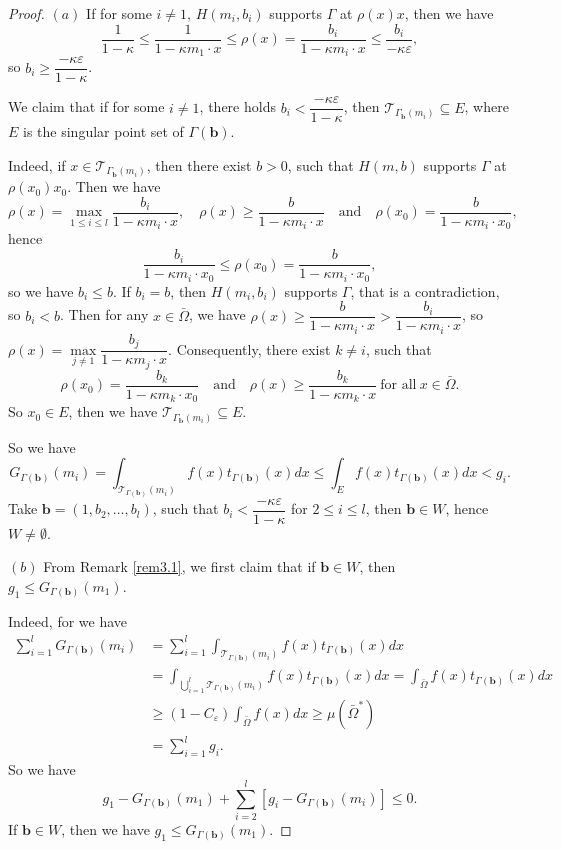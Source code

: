 \documentclass[a4paper,12pt,]{article}
\numberwithin{equation}{section}
\numberwithin{equation}{section} \allowdisplaybreaks
\begin{document}
\begin{proof}
  $(a)$ If for some $i \neq 1$, $H(m_{i},b_{i})$ supports $\Gamma$ at $\rho(x)x$, then we have
  $$\frac{1}{1 - \kappa} \leq \frac{1}{1 - \kappa m_{1} \cdot x} \leq \rho(x) = \frac{b_{i}}{1 - \kappa m_{i} \cdot x} \leq \frac{b_{i}}{-\kappa \varepsilon},$$
  so $b_{i} \geq \dfrac{-\kappa \varepsilon}{1 - \kappa}$.

  We claim that if for some $i \neq 1$, there holds $b_{i} < \dfrac{-\kappa \varepsilon}{1 - \kappa}$, then $\mathcal{T}_{\Gamma_{\mathbf{b}}(m_{i})} \subseteq E$, where $E$ is the singular point set of $\Gamma(\mathbf{b})$.

  Indeed, if $x \in \mathcal{T}_{\Gamma_{\mathbf{b}}(m_{i})}$, then there exist $b>0$, such that $H(m,b)$ supports $\Gamma$ at $\rho(x_{0})x_{0}$. Then we have
  $$\rho(x) = \max_{1 \leq i \leq l}\frac{b_{i}}{1 - \kappa m_{i} \cdot x}, \quad \rho(x) \geq \frac{b}{1 - \kappa m_{i} \cdot x} \quad \text{and} \quad \rho(x_{0}) = \frac{b}{1 - \kappa m_{i} \cdot x_{0}},$$
  hence
  $$\frac{b_{i}}{1 - \kappa m_{i} \cdot x_{0}} \leq \rho(x_{0}) = \frac{b}{1 - \kappa m_{i} \cdot x_{0}},$$
  so we have $b_{i} \leq b$. If $b_{i} = b$, then $H(m_{i},b_{i})$ supports $\Gamma$, that is a contradiction, so $b_{i} < b$. Then for any $x \in \bar{\Omega}$, we have $\rho(x) \geq \dfrac{b}{1 - \kappa m_{i} \cdot x} > \dfrac{b_{i}}{1 - \kappa m_{i} \cdot x}$, so $\rho(x) = \max\limits_{j \neq 1} \dfrac{b_{j}}{1 - \kappa m_{j} \cdot x}$. Consequently, there exist $k \neq i$, such that
  $$\rho(x_{0}) = \frac{b_{k}}{1 - \kappa m_{k} \cdot x_{0}} \quad \text{and} \quad \rho(x) \geq \frac{b_{k}}{1 - \kappa m_{k} \cdot x}~\text{for all}~x\in \bar{\Omega}.$$
  So $x_{0} \in E$, then we have $\mathcal{T}_{\Gamma_{\mathbf{b}}(m_{i})} \subseteq E$.

  So we have
  $$G_{\Gamma(\mathbf{b})}(m_{i}) = \int_{\mathcal{T}_{\Gamma(\mathbf{b})}(m_{i})}f(x)t_{\Gamma(\mathbf{b})}(x)dx \leq  \int_{E}f(x)t_{\Gamma(\mathbf{b})}(x)dx < g_{i}.$$
  Take $\mathbf{b} = (1,b_{2}, \ldots, b_{l})$, such that $b_{i} < \dfrac{-\kappa \varepsilon}{1 - \kappa}$ for $2 \leq i \leq l$, then $\mathbf{b} \in W$, hence $W \neq \emptyset$.

  $(b)$ From Remark \ref{rem3.1}, we first claim that if $\mathbf{b} \in W$, then $g_{1} \leq G_{\Gamma(\mathbf{b})}(m_{1})$.

  Indeed, for we have
  \begin{align*}
     \sum_{i=1}^{l} G_{\Gamma(\mathbf{b})}(m_{i}) & =  \sum_{i=1}^{l} \int_{\mathcal{T}_{\Gamma(\mathbf{b})}(m_{i})}f(x)t_{\Gamma(\mathbf{b})}(x)dx \\
     & =  \int_{\bigcup\limits_{i=1}^{l}\mathcal{T}_{\Gamma(\mathbf{b})}(m_{i})}f(x)t_{\Gamma(\mathbf{b})}(x)dx  =  \int_{\bar{\Omega}}f(x)t_{\Gamma(\mathbf{b})}(x)dx\\
     & \geq (1 - C_{\varepsilon})\int_{\bar{\Omega}}f(x)dx \geq \mu(\bar{\Omega}^{\ast}) \\
     & = \sum_{i = 1}^{l} g_{i}.
  \end{align*}
  So we have
  $$g_{1} - G_{\Gamma(\mathbf{b})}(m_{1}) + \sum_{i=2}^{l}[g_{i} - G_{\Gamma(\mathbf{b})}(m_{i})] \leq 0. $$
  If $\mathbf{b} \in W$, then we have $g_{1} \leq G_{\Gamma(\mathbf{b})}(m_{1}).$


\end{proof}
\end{document}

